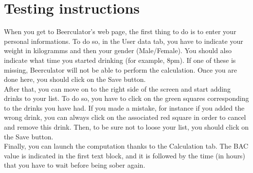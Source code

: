 \section{Testing instructions}
\label{sec:test}

When you get to Beerculator's web page, the first thing to do is to enter your personal informations. To do so, in the \guillemotleft{} User data \guillemotright{} tab, you have to indicate your weight in kilogramms and then your gender (Male/Female). You should also indicate what time you started drinking (for example, 8pm). If one of these is missing, Beerculator will not be able to perform the calculation. Once you are done here, you should click on the \guillemotleft{} Save \guillemotright{} button.\\

After that, you can move on to the right side of the screen and start adding drinks to your list. To do so, you have to click on the green squares corresponding to the drinks you have had. If you made a mistake, for instance if you added the wrong drink, you can always click on the associated red square in order to cancel and remove this drink. Then, to be sure not to loose your list, you should click on the \guillemotleft{} Save \guillemotright{} button.\\

Finally, you can launch the computation thanks to the \guillemotleft{} Calculation \guillemotright{} tab. The BAC value is indicated in the first text block, and it is followed by the time (in hours) that you have to wait before being sober again.